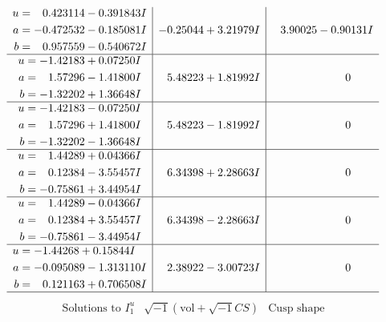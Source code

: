 \documentclass[1p]{elsarticle_modified}
\theoremstyle{definition}
\newcommand{\I}{\sqrt{-1}}
\begin{document}
$$\begin{array}{c|c|c}
\begin{aligned}
u &= \phantom{-}0.423114 - 0.391843 I \\
a &= -0.472532 - 0.185081 I \\
b &= \phantom{-}0.957559 - 0.540672 I\end{aligned}
 & -0.25044 + 3.21979 I & \phantom{-}3.90025 - 0.90131 I \\ \hline\begin{aligned}
u &= -1.42183 + 0.07250 I \\
a &= \phantom{-}1.57296 - 1.41800 I \\
b &= -1.32202 + 1.36648 I\end{aligned}
 & \phantom{-}5.48223 + 1.81992 I & \phantom{-0.000000 } 0 \\ \hline\begin{aligned}
u &= -1.42183 - 0.07250 I \\
a &= \phantom{-}1.57296 + 1.41800 I \\
b &= -1.32202 - 1.36648 I\end{aligned}
 & \phantom{-}5.48223 - 1.81992 I & \phantom{-0.000000 } 0 \\ \hline\begin{aligned}
u &= \phantom{-}1.44289 + 0.04366 I \\
a &= \phantom{-}0.12384 - 3.55457 I \\
b &= -0.75861 + 3.44954 I\end{aligned}
 & \phantom{-}6.34398 + 2.28663 I & \phantom{-0.000000 } 0 \\ \hline\begin{aligned}
u &= \phantom{-}1.44289 - 0.04366 I \\
a &= \phantom{-}0.12384 + 3.55457 I \\
b &= -0.75861 - 3.44954 I\end{aligned}
 & \phantom{-}6.34398 - 2.28663 I & \phantom{-0.000000 } 0 \\ \hline\begin{aligned}
u &= -1.44268 + 0.15844 I \\
a &= -0.095089 - 1.313110 I \\
b &= \phantom{-}0.121163 + 0.706508 I\end{aligned}
 & \phantom{-}2.38922 - 3.00723 I & \phantom{-0.000000 } 0\\
 \hline 
 \end{array}$$\newpage$$\begin{array}{c|c|c}  
\text{Solutions to }I^u_{1}& \I (\text{vol} + \sqrt{-1}CS) & \text{Cusp shape}\\
 \hline 
\begin{aligned}

\end{aligned}
\end{array}$$
\end{document}
